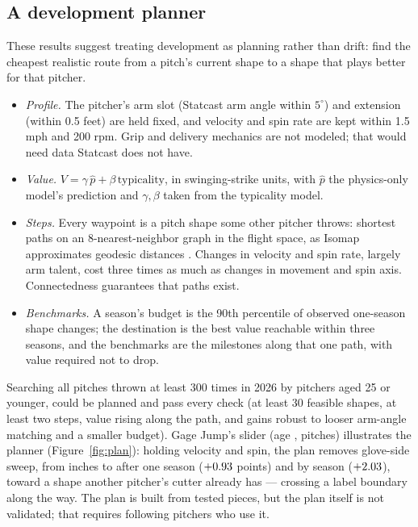 \documentclass{article}
\theoremstyle{definition}
\theoremstyle{remark}
\begin{document}
\subsection{A development planner}
These results suggest treating development as planning rather than drift: find the cheapest realistic route from a pitch's current shape to a shape that plays better for that pitcher.
\begin{itemize}
  \item \emph{Profile.} The pitcher's arm slot (Statcast arm angle within $5^\circ$) and extension (within 0.5 feet) are held fixed, and velocity and spin rate are kept within 1.5 mph and 200 rpm. Grip and delivery mechanics are not modeled; that would need data Statcast does not have.
  \item \emph{Value.} $V = \gamma\, \hat p + \beta\, \text{typicality}$, in swinging-strike units, with $\hat p$ the physics-only model's prediction and $\gamma, \beta$ taken from the typicality model.
  \item \emph{Steps.} Every waypoint is a pitch shape some other pitcher throws: shortest paths on an 8-nearest-neighbor graph in the flight space, as Isomap approximates geodesic distances \parencite{sklearn_userguide_manifold}. Changes in velocity and spin rate, largely arm talent, cost three times as much as changes in movement and spin axis. Connectedness guarantees that paths exist.
  \item \emph{Benchmarks.} A season's budget is the 90th percentile of observed one-season shape changes; the destination is the best value reachable within three seasons, and the benchmarks are the milestones along that one path, with value required not to drop.
\end{itemize}
Searching all pitches thrown at least 300 times in 2026 by pitchers aged 25 or younger, \YoungPlanned{} could be planned and \YoungClear{} pass every check (at least 30 feasible shapes, at least two steps, value rising along the path, and gains robust to looser arm-angle matching and a smaller budget).
Gage Jump's slider (age \JumpAge, \JumpN{} pitches) illustrates the planner (Figure~\ref{fig:plan}): holding velocity and spin, the plan removes glove-side sweep, from \JumpSweepStart{} inches to \JumpSweepOne{} after one season ($+0.93$ points) and \JumpSweepEnd{} by season \JumpEndSeason{} ($+2.03$), toward a shape another pitcher's cutter already has --- crossing a label boundary along the way.
The plan is built from tested pieces, but the plan itself is not validated; that requires following pitchers who use it.
\end{document}
